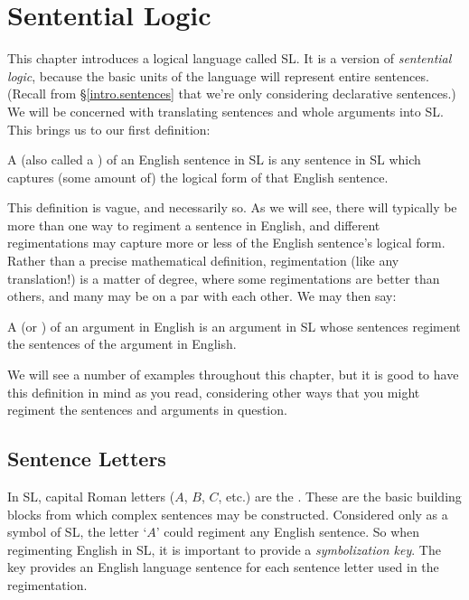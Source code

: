 \chapter{Sentential Logic}
\label{ch.SL}




This chapter introduces a logical language called SL.
It is a version of \emph{sentential logic}, because the basic units of the language will represent entire sentences.
(Recall from \S\ref{intro.sentences} that we're only considering declarative sentences.)
We will be concerned with translating sentences and whole arguments into SL.
This brings us to our first definition: 
  
A  (also called a ) of an English sentence in SL is any sentence in SL which captures (some amount of) the logical form of that English sentence.

This definition is vague, and necessarily so.
As we will see, there will typically be more than one way to regiment a sentence in English, and different regimentations may capture more or less of the English sentence's logical form.
Rather than a precise mathematical definition, regimentation (like any translation!) is a matter of degree, where some regimentations are better than others, and many may be on a par with each other.
We may then say:

A  (or ) of an argument in English is an argument in SL whose sentences regiment the sentences of the argument in English.

We will see a number of examples throughout this chapter, but it is good to have this definition in mind as you read, considering other ways that you might regiment the sentences and arguments in question.




\section{Sentence Letters}

In SL, capital Roman letters ($A$, $B$, $C$, etc.) are the .
These are the basic building blocks from which complex sentences may be constructed.
Considered only as a symbol of SL, the letter `$A$' could regiment any English sentence.
So when regimenting English in SL, it is important to provide a \emph{symbolization key}.
The key provides an English language sentence for each sentence letter used in the regimentation.

